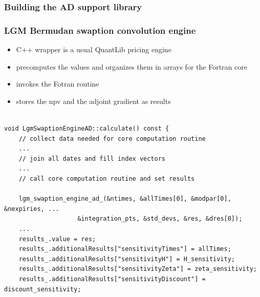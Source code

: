 \documentclass[10pt,German]{beamer}
\begin{document}
\begin{frame}[fragile]
\frametitle{Building the AD support library}
\end{frame}

\begin{frame}[fragile]
\frametitle{LGM Bermudan swaption convolution engine}
\begin{itemize}
\item C++ wrapper is a usual QuantLib pricing engine
\item precomputes the values and organizes them in arrays for the Fortran core
\item invokes the Fotran routine
\item stores the npv and the adjoint gradient as results
\end{itemize}
\begin{verbatim}

void LgmSwaptionEngineAD::calculate() const {
    // collect data needed for core computation routine
    ...
    // join all dates and fill index vectors
    ...
    // call core computation routine and set results

    lgm_swaption_engine_ad_(&ntimes, &allTimes[0], &modpar[0], &nexpiries, ...
                    &integration_pts, &std_devs, &res, &dres[0]);
    ...
    results_.value = res;
    results_.additionalResults["sensitivityTimes"] = allTimes;
    results_.additionalResults["sensitivityH"] = H_sensitivity;
    results_.additionalResults["sensitivityZeta"] = zeta_sensitivity;
    results_.additionalResults["sensitivityDiscount"] = discount_sensitivity;
\end{verbatim}
\end{frame}
\end{document}

